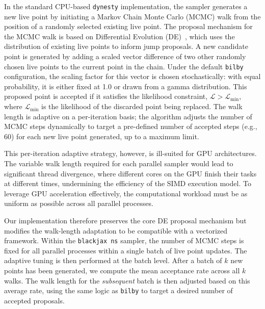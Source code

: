 \documentclass[fleqn,usenatbib]{mnras}
\begin{document}
In the standard CPU-based \texttt{dynesty} implementation, the sampler
generates a new live point by initiating a Markov Chain Monte Carlo
(MCMC) walk from the position of a randomly selected existing live
point. The proposal mechanism for the MCMC walk is based on Differential
Evolution (DE)~\citep{DE, DE2}, which uses the distribution of existing live points to
inform jump proposals. A new candidate point is generated by adding a
scaled vector difference of two other randomly chosen live points to the
current point in the chain. Under the default \texttt{bilby} configuration, 
the scaling factor for this vector is chosen stochastically: with equal probability, 
it is either fixed at 1.0 or drawn from a gamma distribution. This proposed 
point is accepted if it satisfies the likelihood constraint, $\mathcal{L} > \mathcal{L}_{\text{min}}$,
where $\mathcal{L}_{\text{min}}$ is the likelihood of the
discarded point being replaced. The walk length is adaptive on a per-iteration
basis; the algorithm adjusts the number of MCMC steps dynamically to
target a pre-defined number of accepted steps (e.g., 60) for each new
live point generated, up to a maximum limit.

This per-iteration adaptive strategy, however, is ill-suited for GPU
architectures. The variable walk length required for each parallel
sampler would lead to significant thread divergence, where different
cores on the GPU finish their tasks at different times, undermining the
efficiency of the SIMD execution model. To leverage GPU acceleration
effectively, the computational workload must be as uniform as possible
across all parallel processes.

Our implementation therefore preserves the core DE proposal mechanism but
modifies the walk-length adaptation to be compatible with a vectorized
framework. Within the \texttt{blackjax ns} sampler, the number of MCMC
steps is fixed for all parallel processes within a single batch of
live point updates. The adaptive tuning is then performed at the batch
level. After a batch of $k$ new points has been generated, we compute
the mean acceptance rate across all $k$ walks. The walk length for the
\textit{subsequent} batch is then adjusted based on this average rate,
using the same logic as \texttt{bilby} to target a desired number of
accepted proposals.
\end{document}

